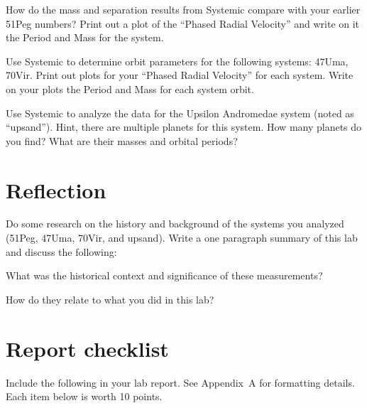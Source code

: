 \begin{steps}
	\item How do the mass and separation results from Systemic compare with your earlier 51Peg numbers? Print out a plot of the ``Phased Radial Velocity'' and write on it the Period and Mass for the system.
	
	\item Use Systemic to determine orbit parameters for the following systems: 47Uma, 70Vir. Print out plots for your ``Phased Radial Velocity'' for each system. Write on your plots the Period and Mass for each system orbit.
	
	\item Use Systemic to analyze the data for the Upsilon Andromedae system (noted as ``upsand''). Hint, there are multiple planets for this system. How many planets do you find? What are their masses and orbital periods?
	
\end{steps}

\section{Reflection}

Do some research on the history and background of the systems you analyzed (51Peg, 47Uma, 70Vir, and upsand). Write a one paragraph summary of this lab and discuss the following:

\begin{steps}
	\item What was the historical context and significance of these measurements?
	
	\item How do they relate to what you did in this lab?
\end{steps}

\section{Report checklist}

Include the following in your lab report. See Appendix~A for formatting details. Each item below is worth 10 points.

